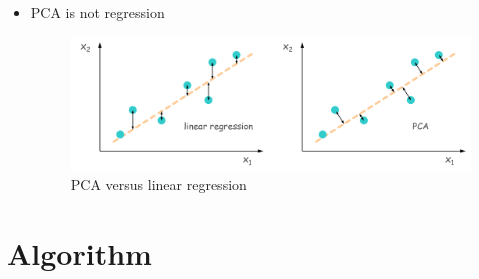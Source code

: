\begin{itemize}
    \item PCA is not regression
    \begin{figure}[!htbp]
        \centering
        \includegraphics[width=4.4in]{./images/pcaVersusLinearRegression.png}
        \caption{PCA versus linear regression}
    \end{figure}
\end{itemize}


\section{Algorithm}
